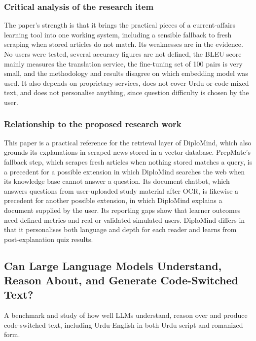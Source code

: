 \documentclass{FastFyp}
\begin{document}
\subsubsection{Critical analysis of the research item}
The paper's strength is that it brings the practical pieces of a current-affairs learning tool into one working system, including a sensible fallback to fresh scraping when stored articles do not match. Its weaknesses are in the evidence. No users were tested, several accuracy figures are not defined, the BLEU score mainly measures the translation service, the fine-tuning set of 100 pairs is very small, and the methodology and results disagree on which embedding model was used. It also depends on proprietary services, does not cover Urdu or code-mixed text, and does not personalise anything, since question difficulty is chosen by the user.

\subsubsection{Relationship to the proposed research work}
This paper is a practical reference for the retrieval layer of DiploMind, which also grounds its explanations in scraped news stored in a vector database. PrepMate's fallback step, which scrapes fresh articles when nothing stored matches a query, is a precedent for a possible extension in which DiploMind searches the web when its knowledge base cannot answer a question. Its document chatbot, which answers questions from user-uploaded study material after OCR, is likewise a precedent for another possible extension, in which DiploMind explains a document supplied by the user. Its reporting gaps show that learner outcomes need defined metrics and real or validated simulated users. DiploMind differs in that it personalises both language and depth for each reader and learns from post-explanation quiz results.



\subsection{Can Large Language Models Understand, Reason About, and Generate Code-Switched Text?}
A benchmark and study of how well LLMs understand, reason over and produce code-switched text, including Urdu-English in both Urdu script and romanized form.
\end{document}
